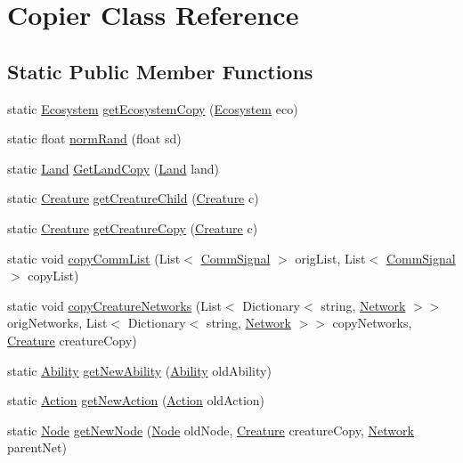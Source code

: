 \hypertarget{class_copier}{}\section{Copier Class Reference}
\label{class_copier}
\subsection*{Static Public Member Functions}
\begin{DoxyCompactItemize}
\item 
static \mbox{\hyperlink{class_ecosystem}{Ecosystem}} \mbox{\hyperlink{class_copier_a19904060ea391728436f2f36ddf36a73}{get\+Ecosystem\+Copy}} (\mbox{\hyperlink{class_ecosystem}{Ecosystem}} eco)
\item 
static float \mbox{\hyperlink{class_copier_a187d00289a5f7c8d3b2d20a3468e9416}{norm\+Rand}} (float sd)
\item 
static \mbox{\hyperlink{class_land}{Land}} \mbox{\hyperlink{class_copier_ac38173e26db80dad92a6ca9cd083f058}{Get\+Land\+Copy}} (\mbox{\hyperlink{class_land}{Land}} land)
\item 
static \mbox{\hyperlink{class_creature}{Creature}} \mbox{\hyperlink{class_copier_a399f96d475da045dd0e9434c9054f161}{get\+Creature\+Child}} (\mbox{\hyperlink{class_creature}{Creature}} c)
\item 
static \mbox{\hyperlink{class_creature}{Creature}} \mbox{\hyperlink{class_copier_a468c753ccc3b2192bb49b8be03edf18c}{get\+Creature\+Copy}} (\mbox{\hyperlink{class_creature}{Creature}} c)
\item 
static void \mbox{\hyperlink{class_copier_a4013b1f8da509a6471f0feed3ec94ae3}{copy\+Comm\+List}} (List$<$ \mbox{\hyperlink{class_comm_signal}{Comm\+Signal}} $>$ orig\+List, List$<$ \mbox{\hyperlink{class_comm_signal}{Comm\+Signal}} $>$ copy\+List)
\item 
static void \mbox{\hyperlink{class_copier_a4c529b374830077f75db4520bb55e225}{copy\+Creature\+Networks}} (List$<$ Dictionary$<$ string, \mbox{\hyperlink{class_network}{Network}} $>$$>$ orig\+Networks, List$<$ Dictionary$<$ string, \mbox{\hyperlink{class_network}{Network}} $>$$>$ copy\+Networks, \mbox{\hyperlink{class_creature}{Creature}} creature\+Copy)
\item 
static \mbox{\hyperlink{class_ability}{Ability}} \mbox{\hyperlink{class_copier_a0912151eec03dadf8d375bde174522aa}{get\+New\+Ability}} (\mbox{\hyperlink{class_ability}{Ability}} old\+Ability)
\item 
static \mbox{\hyperlink{class_action}{Action}} \mbox{\hyperlink{class_copier_a12cae9390220b2dcee8472e3ab5ec38f}{get\+New\+Action}} (\mbox{\hyperlink{class_action}{Action}} old\+Action)
\item 
static \mbox{\hyperlink{class_node}{Node}} \mbox{\hyperlink{class_copier_a2bc3b60cb77fb710cf7e4802ceb16d03}{get\+New\+Node}} (\mbox{\hyperlink{class_node}{Node}} old\+Node, \mbox{\hyperlink{class_creature}{Creature}} creature\+Copy, \mbox{\hyperlink{class_network}{Network}} parent\+Net)
\end{DoxyCompactItemize}
